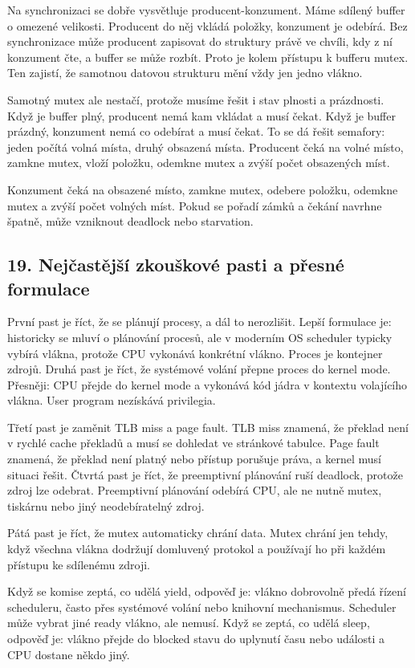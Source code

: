 \documentclass[11pt,a4paper]{article}
\begin{document}
Na synchronizaci se dobře vysvětluje producent-konzument. Máme sdílený buffer o omezené velikosti. Producent do něj vkládá položky, konzument je odebírá. Bez synchronizace může producent zapisovat do struktury právě ve chvíli, kdy z ní konzument čte, a buffer se může rozbít. Proto je kolem přístupu k bufferu mutex. Ten zajistí, že samotnou datovou strukturu mění vždy jen jedno vlákno.

Samotný mutex ale nestačí, protože musíme řešit i stav plnosti a prázdnosti. Když je buffer plný, producent nemá kam vkládat a musí čekat. Když je buffer prázdný, konzument nemá co odebírat a musí čekat. To se dá řešit semafory: jeden počítá volná místa, druhý obsazená místa. Producent čeká na volné místo, zamkne mutex, vloží položku, odemkne mutex a zvýší počet obsazených míst.

Konzument čeká na obsazené místo, zamkne mutex, odebere položku, odemkne mutex a zvýší počet volných míst. Pokud se pořadí zámků a čekání navrhne špatně, může vzniknout deadlock nebo starvation.

\subsection*{19. Nejčastější zkouškové pasti a přesné formulace}

První past je říct, že se plánují procesy, a dál to nerozlišit. Lepší formulace je: historicky se mluví o plánování procesů, ale v moderním OS scheduler typicky vybírá vlákna, protože CPU vykonává konkrétní vlákno. Proces je kontejner zdrojů. Druhá past je říct, že systémové volání přepne proces do kernel mode. Přesněji: CPU přejde do kernel mode a vykonává kód jádra v kontextu volajícího vlákna. User program nezískává privilegia.

Třetí past je zaměnit TLB miss a page fault. TLB miss znamená, že překlad není v rychlé cache překladů a musí se dohledat ve stránkové tabulce. Page fault znamená, že překlad není platný nebo přístup porušuje práva, a kernel musí situaci řešit. Čtvrtá past je říct, že preemptivní plánování ruší deadlock, protože zdroj lze odebrat. Preemptivní plánování odebírá CPU, ale ne nutně mutex, tiskárnu nebo jiný neodebíratelný zdroj.

Pátá past je říct, že mutex automaticky chrání data. Mutex chrání jen tehdy, když všechna vlákna dodržují domluvený protokol a používají ho při každém přístupu ke sdílenému zdroji.

Když se komise zeptá, co udělá yield, odpověď je: vlákno dobrovolně předá řízení scheduleru, často přes systémové volání nebo knihovní mechanismus. Scheduler může vybrat jiné ready vlákno, ale nemusí. Když se zeptá, co udělá sleep, odpověď je: vlákno přejde do blocked stavu do uplynutí času nebo události a CPU dostane někdo jiný.
\end{document}
